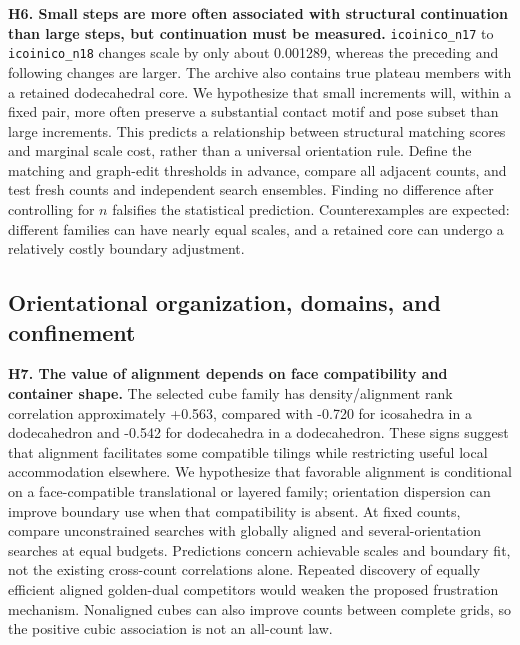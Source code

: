 \documentclass[11pt,a4paper]{article}
\begin{document}
\textbf{H6. Small steps are more often associated with structural continuation than large steps, but continuation must be measured.} \nolinkurl{icoinico_n17} to \nolinkurl{icoinico_n18} changes scale by only about 0.001289, whereas the preceding and following changes are larger. The archive also contains true plateau members with a retained dodecahedral core. We hypothesize that small increments will, within a fixed pair, more often preserve a substantial contact motif and pose subset than large increments. This predicts a relationship between structural matching scores and marginal scale cost, rather than a universal orientation rule. Define the matching and graph-edit thresholds in advance, compare all adjacent counts, and test fresh counts and independent search ensembles. Finding no difference after controlling for $n$ falsifies the statistical prediction. Counterexamples are expected: different families can have nearly equal scales, and a retained core can undergo a relatively costly boundary adjustment.

\subsection{Orientational organization, domains, and confinement}

\textbf{H7. The value of alignment depends on face compatibility and container shape.} The selected cube family has density/alignment rank correlation approximately +0.563, compared with -0.720 for icosahedra in a dodecahedron and -0.542 for dodecahedra in a dodecahedron. These signs suggest that alignment facilitates some compatible tilings while restricting useful local accommodation elsewhere. We hypothesize that favorable alignment is conditional on a face-compatible translational or layered family; orientation dispersion can improve boundary use when that compatibility is absent. At fixed counts, compare unconstrained searches with globally aligned and several-orientation searches at equal budgets. Predictions concern achievable scales and boundary fit, not the existing cross-count correlations alone. Repeated discovery of equally efficient aligned golden-dual competitors would weaken the proposed frustration mechanism. Nonaligned cubes can also improve counts between complete grids, so the positive cubic association is not an all-count law.
\end{document}
